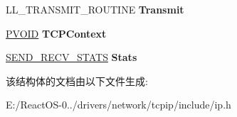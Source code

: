 \begin{DoxyCompactItemize}
\item 
\mbox{\label{struct___i_p___i_n_t_e_r_f_a_c_e_a6cc271b777d4e7038a91ee99814ac087}} 
L\+L\+\_\+\+T\+R\+A\+N\+S\+M\+I\+T\+\_\+\+R\+O\+U\+T\+I\+NE {\bfseries Transmit}
\item 
\mbox{\label{struct___i_p___i_n_t_e_r_f_a_c_e_ab7e9632ebc6cc92a36d0b89f0eee304d}} 
\hyperlink{interfacevoid}{P\+V\+O\+ID} {\bfseries T\+C\+P\+Context}
\item 
\mbox{\label{struct___i_p___i_n_t_e_r_f_a_c_e_abd7852401843249039eace391f28833b}} 
\hyperlink{struct___s_e_n_d___r_e_c_v___s_t_a_t_s}{S\+E\+N\+D\+\_\+\+R\+E\+C\+V\+\_\+\+S\+T\+A\+TS} {\bfseries Stats}
\end{DoxyCompactItemize}


该结构体的文档由以下文件生成\+:\begin{DoxyCompactItemize}
\item 
E\+:/\+React\+O\+S-\/0../drivers/network/tcpip/include/ip.\+h\end{DoxyCompactItemize}
